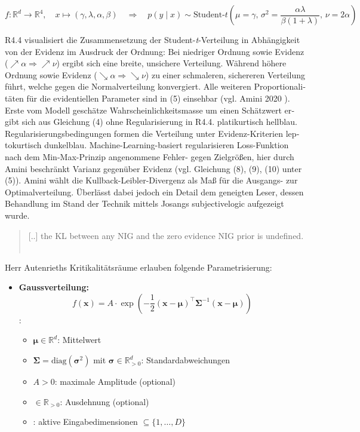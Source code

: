 \begin{otherlanguage}{ngerman}
\[
f : \mathbb{R}^d \to \mathbb{R}^4, \quad x \mapsto (\gamma, \lambda, \alpha, \beta) \quad \Rightarrow \quad p(y \mid x) \sim \text{Student-}t\left(\mu = \gamma,\, \sigma^2 = \frac{\alpha \lambda}{\beta (1 + \lambda)},\, \nu = 2\alpha\right)
\]

R4.4 visualisiert die Zusammensetzung der Student-\emph{t}-Verteilung in Abhängigkeit von der Evidenz im Ausdruck der Ordnung: Bei niedriger Ordnung sowie Evidenz (\(\nearrow \alpha \Rightarrow \nearrow \nu\)) ergibt sich eine breite, unsichere Verteilung. Während höhere Ordnung sowie Evidenz (\(\searrow \alpha \Rightarrow \searrow \nu\)) zu einer schmaleren, sichereren Verteilung führt, welche gegen die Normalverteilung konvergiert. Alle weiteren Proportionalitäten für die evidentiellen Parameter sind in (5) einsehbar (vgl. Amini 2020 \parencite{amini2020}). Erste vom Modell geschätze Wahrscheinlichkeitsmasse um einen Schätzwert ergibt sich aus Gleichung (4) ohne Regularisierung in R4.4. platikurtisch hellblau. Regularisierungsbedingungen formen die Verteilung unter Evidenz-Kriterien leptokurtisch dunkelblau. Machine-Learning-basiert regularisieren Loss-Funktion nach dem Min-Max-Prinzip angenommene Fehler- gegen Zielgrößen, hier durch Amini beschränkt Varianz gegenüber Evidenz (vgl. Gleichung (8), (9), (10) unter (5)). Amini wählt die Kullback-Leibler-Divergenz als Maß für die Ausgangs- zur Optimalverteilung. Überlässt dabei jedoch ein Detail dem geneigten Leser, dessen Behandlung im Stand der Technik mittels Josangs \gls{subjectivelogic} aufgezeigt wurde.

\begin{quote}
  \glqq{}[..] the KL between any NIG and the zero evidence NIG prior is undefined.\grqq{} \newline ~\parencite[{S. 5, \glqq Minimizing evidence on errors \grqq, Z. 6 ff.}]{amini2020deep}
\end{quote}

Herr Autenrieths Kritikalitätsräume erlauben folgende Parametrisierung: 

\begin{itemize}
  \item \textbf{Gaussverteilung:}
    \[
    f(\mathbf{x}) = A \cdot \exp\left(-\frac{1}{2} (\mathbf{x} - \boldsymbol{\mu})^\top \mathbf{\Sigma}^{-1} (\mathbf{x} - \boldsymbol{\mu}) \right)
    \]
    :
    \begin{itemize}
      \item $\boldsymbol{\mu} \in \mathbb{R}^d$: Mittelwert
      \item $\mathbf{\Sigma} = \mathrm{diag}(\boldsymbol{\sigma}^2)$ mit $\boldsymbol{\sigma} \in \mathbb{R}_{>0}^d$: Standardabweichungen
      \item $A > 0$: maximale Amplitude (optional)
      \item {} $\in \mathbb{R}_{>0}$: Ausdehnung (optional)
      \item {}: aktive Eingabedimensionen $\subseteq \{1, \dots, D\}$
    \end{itemize}


\end{itemize}
\end{otherlanguage}
